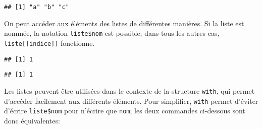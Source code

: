 \begin{knitrout}
\color{fgcolor}\begin{kframe}
\begin{flushleft}
\ttfamily\noindent
{}\hlkeyword{(}\hlkeyword{)}\mbox{}
\normalfont
\end{flushleft}
\begin{verbatim}
## [1] "a" "b" "c"
\end{verbatim}
\end{kframe}
\end{knitrout}


On peut accéder aux éléments des listes de différentes manières.
Si la liste est nommée, la notation \texttt{liste\$nom} est possible; dans tous les autres cas, \texttt{liste[[indice]]} fonctionne.

\begin{knitrout}
\color{fgcolor}\begin{kframe}
\begin{flushleft}
\ttfamily\noindent
{}\hlkeyword{\usebox{\hlnormalsizeboxdollar}}\mbox{}
\normalfont
\end{flushleft}
\begin{verbatim}
## [1] 1
\end{verbatim}
\begin{flushleft}
\ttfamily\noindent
{}\hlkeyword{[[}\hlkeyword{]}\hlkeyword{]}\mbox{}
\normalfont
\end{flushleft}
\begin{verbatim}
## [1] 1
\end{verbatim}
\end{kframe}
\end{knitrout}


Les listes peuvent être utilisées dans le contexte de la structure \texttt{with}, qui permet d'accéder facilement aux différents éléments.
Pour simplifier, \texttt{with} permet d'éviter d'écrire \texttt{liste\$nom} pour n'écrire que \texttt{nom}; les deux commandes ci-dessous sont donc équivalentes:

